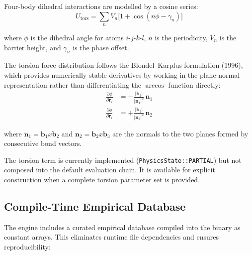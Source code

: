 \documentclass[11pt,twoside]{article}
\def\times{x}%
\newcommand{\type}[1]{\texttt{#1}}
\begin{document}
Four-body dihedral interactions are modelled by a cosine series:
\begin{equation}
  U_{\mathrm{tors}} = \sum_n V_n \bigl[1 + \cos(n\phi - \gamma_n)\bigr]
  \label{eq:torsion}
\end{equation}

where $\phi$ is the dihedral angle for atoms $i$-$j$-$k$-$l$, $n$ is the periodicity, $V_n$ is the barrier height, and $\gamma_n$ is the phase offset.

The torsion force distribution follows the Blondel--Karplus formulation (1996), which provides numerically stable derivatives by working in the plane-normal representation rather than differentiating the $\arccos$ function directly:
\begin{align}
  \frac{\partial\phi}{\partial\mathbf{r}_i} &= -\frac{|\mathbf{b}_2|}{|\mathbf{n}_1|^2}\, \mathbf{n}_1 \label{eq:tors-fi} \\
  \frac{\partial\phi}{\partial\mathbf{r}_l} &= +\frac{|\mathbf{b}_2|}{|\mathbf{n}_2|^2}\, \mathbf{n}_2 \label{eq:tors-fl}
\end{align}

where $\mathbf{n}_1 = \mathbf{b}_1 \times \mathbf{b}_2$ and $\mathbf{n}_2 = \mathbf{b}_2 \times \mathbf{b}_3$ are the normals to the two planes formed by consecutive bond vectors.

The torsion term is currently implemented (\type{PhysicsState::PARTIAL}) but not composed into the default evaluation chain. It is available for explicit construction when a complete torsion parameter set is provided.

\subsection{Compile-Time Empirical Database}

The engine includes a curated empirical database compiled into the binary as constant arrays. This eliminates runtime file dependencies and ensures reproducibility:
\end{document}
